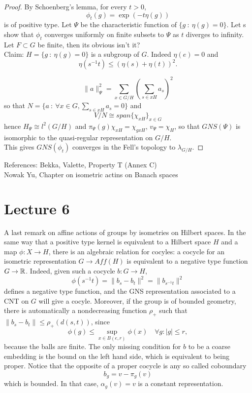 \begin{proof} By Schoenberg's lemma, for every $t>0$, 
\[\phi_t(g) = \exp(-t\eta(g))\]
is of positive type. Let $\Psi$ be the characteristic function of $\{ g\ : \ \eta(g) = 0\}$. Let s show that $\phi_t$ converges uniformly on finite subsets to $\Psi$ as $t$ diverges to infinity. Let $F\subset G$ be finite, then its obvious isn't it?\\

Claim: $H= \{ g\ : \ \eta(g) = 0\}$ is a subgroup of $G$. Indeed $\eta(e)=0$ and 
\[\eta(s^{-1}t) \leq (\eta(s)+\eta(t))^2. \]

\[\|a\|^2_\Psi = \sum_{x\in G/H} (\sum_{s\in xH} a_s)^2\]
so that $N = \{a \ : \ \forall x\in G, \sum_{s\in xH} a_s = 0\}$ and
\[V/N \cong span \{ \chi_{xH}\}_{x\in G} \]
hence $H_{\Psi}\cong l^2(G/H)$ and $\pi_\Psi(g)\chi_{xH}= \chi_{gxH}$, $v_\Psi = \chi_{H}$, so that $GNS(\Psi)$ is isomorphic to the quasi-regular representation on $G/H$.\\	

This gives $GNS(\phi_t)$ converges in the Fell's topology to $\lambda_{G/H}$.
\end{proof} 

References: Bekka, Valette, Property T (Annex C)\\
Nowak Yu, Chapter on isometric actins on Banach spaces\\

\section{Lecture 6}

A last remark on affine actions of groups by isometries on Hilbert spaces. In the same way that a positive type kernel is equivalent to a Hilbert space $H$ and a map $\phi : X \rightarrow H$, there is an algebraic relation for cocyles: a cocycle for an isometric representation $G\rightarrow Aff(H)$ is equivalent to a negative type function $G\rightarrow \mathbb R$. Indeed, given such a cocycle $b: G \rightarrow H$,
\[\phi(s^{-1}t) = \|b_s-b_t\|^2=\| b_{s^{-1}t}\|^2\]
defines a negative type function, and the GNS representation associated to a CNT on $G$ will give a cocyle. Moreover, if the group is of bounded geometry, there is automatically a nondecreasing function $\rho_+$ such that $\|b_s-b_t\|\leq \rho_+(d(s,t))$, since 
\[\phi(g) \leq \sup_{x\in B(e,r)} \phi(x) \quad \forall g : |g|\leq r, \]
because the balls are finite. The only missing condition for $b$ to be a coarse embedding is the bound on the left hand side, which is equivalent to being proper. Notice that the opposite of a proper cocycle is any so called coboundary 
\[b_g = v-\pi_g(v)\]
which is bounded. In that case, $\alpha_g(v)=v$ is a constant representation.\\

